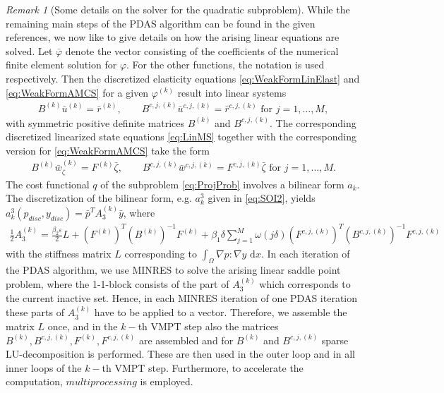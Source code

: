 \documentclass[a4paper,11pt]{article}
\theoremstyle{remark}
\newtheorem{remark}{Remark}%
\newcommand{\phik}{\varphi^{(k)}}
\newcommand{\Bk}{B^{(k)}}
\newcommand{\Bcjk}{B^{c,j,(k)}}
\newcommand{\Fk}{F^{(k)}}
\newcommand{\Fcjk}{F^{c,j,(k)}}
\newcommand{\dx}{\text{ d}x}
\begin{document}
\begin{remark}[Some details on the solver for the quadratic subproblem]
{While the remaining main steps of the PDAS algorithm can be found in the given references, we now like to give details on how the arising linear equations are solved.
Let $\bar \varphi$ denote the vector consisting of the coefficients of the numerical finite element solution for $\varphi$. For the other functions, the notation is used respectively. Then the discretized elasticity equations
  \eqref{eq:WeakFormLinElast} and
  \eqref{eq:WeakFormAMCS}
  for a given $\phik$ result into linear systems 
\begin{align}
  \Bk \bar u^{(k)} = \bar r^{(k)} , \qquad
  \Bcjk \bar u^{c,j,(k)} = \bar r^{c,j,(k)}  \text{ for } j=1,\ldots , M ,
\end{align}
with symmetric positive definite matrices $\Bk$ and
$\Bcjk$.
The corresponding discretized linearized state equations \eqref{eq:LinMS} together with the corresponding version for \eqref{eq:WeakFormAMCS} take the form
\begin{align}
  \Bk \bar w_\zeta^{(k)} = \Fk \bar \zeta ,  \qquad
  \Bcjk \bar w^{c,j,(k)} = \Fcjk  \bar \zeta  \text{ for } j=1,\ldots , M .
\end{align}
%
The cost functional $q$ of the subproblem \eqref{eq:ProjProb} involves a bilinear form $a_k$.
The discretization of the bilinear form, e.g. $a^3_k$ given in \eqref{eq:SOI2}, yields
$  a^3_k(p_{disc},y_{disc})=
\bar p^T A_3^{(k)} \bar y $, where
\begin{align}\label{eq:A4}
\tfrac12 A_3^{(k)}=
\tfrac{\beta_2\varepsilon}{2} L +
  (\Fk )^T (\Bk )^{-1} \Fk
  + \beta_1 \delta \sum_{j=1}^M \omega (j\delta) (\Fcjk )^T  (\Bcjk )^{-1} \Fcjk 
\end{align}
with the stiffness matrix $L$ corresponding to
$\int_\Omega \nabla p : \nabla y \dx $.
In each iteration of the PDAS algorithm, we use MINRES to solve the arising linear saddle point problem, where the 1-1-block consists of the part of $A_3 ^{(k)}$ which corresponds to the current inactive set.
Hence, in each MINRES iteration of one PDAS iteration these parts of $A_3 ^{(k)}$ have to be applied to a vector.
%
Therefore, we assemble the matrix $L$ once, and in the $k-$th VMPT step  also the matrices $\Bk,\Bcjk, \Fk, \Fcjk $ are assembled and for $\Bk$ and $ \Bcjk$ sparse LU-decomposition is performed.
These are then used in the outer loop and in all inner loops of the $k-$th VMPT step. 
Furthermore, to accelerate the computation, $multiprocessing$ is employed.
}\end{remark}
\end{document}
